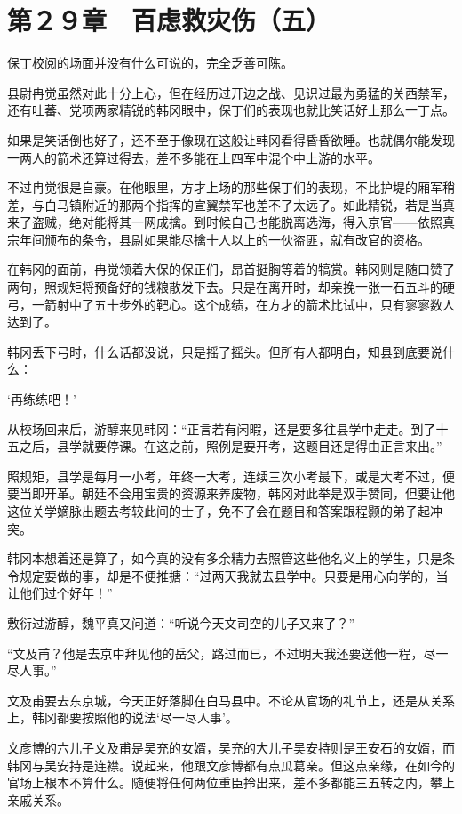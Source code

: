 \section{第２９章　百虑救灾伤（五）}

保丁校阅的场面并没有什么可说的，完全乏善可陈。

县尉冉觉虽然对此十分上心，但在经历过开边之战、见识过最为勇猛的关西禁军，还有吐蕃、党项两家精锐的韩冈眼中，保丁们的表现也就比笑话好上那么一丁点。

如果是笑话倒也好了，还不至于像现在这般让韩冈看得昏昏欲睡。也就偶尔能发现一两人的箭术还算过得去，差不多能在上四军中混个中上游的水平。

不过冉觉很是自豪。在他眼里，方才上场的那些保丁们的表现，不比护堤的厢军稍差，与白马镇附近的那两个指挥的宣翼禁军也差不了太远了。如此精锐，若是当真来了盗贼，绝对能将其一网成擒。到时候自己也能脱离选海，得入京官——依照真宗年间颁布的条令，县尉如果能尽擒十人以上的一伙盗匪，就有改官的资格。

在韩冈的面前，冉觉领着大保的保正们，昂首挺胸等着的犒赏。韩冈则是随口赞了两句，照规矩将预备好的钱粮散发下去。只是在离开时，却亲挽一张一石五斗的硬弓，一箭射中了五十步外的靶心。这个成绩，在方才的箭术比试中，只有寥寥数人达到了。

韩冈丢下弓时，什么话都没说，只是摇了摇头。但所有人都明白，知县到底要说什么：

‘再练练吧！’

从校场回来后，游醇来见韩冈：“正言若有闲暇，还是要多往县学中走走。到了十五之后，县学就要停课。在这之前，照例是要开考，这题目还是得由正言来出。”

照规矩，县学是每月一小考，年终一大考，连续三次小考最下，或是大考不过，便要当即开革。朝廷不会用宝贵的资源来养废物，韩冈对此举是双手赞同，但要让他这位关学嫡脉出题去考较此间的士子，免不了会在题目和答案跟程颢的弟子起冲突。

韩冈本想着还是算了，如今真的没有多余精力去照管这些他名义上的学生，只是条令规定要做的事，却是不便推搪：“过两天我就去县学中。只要是用心向学的，当让他们过个好年！”

敷衍过游醇，魏平真又问道：“听说今天文司空的儿子又来了？”

“文及甫？他是去京中拜见他的岳父，路过而已，不过明天我还要送他一程，尽一尽人事。”

文及甫要去东京城，今天正好落脚在白马县中。不论从官场的礼节上，还是从关系上，韩冈都要按照他的说法‘尽一尽人事’。

文彦博的六儿子文及甫是吴充的女婿，吴充的大儿子吴安持则是王安石的女婿，而韩冈与吴安持是连襟。说起来，他跟文彦博都有点瓜葛亲。但这点亲缘，在如今的官场上根本不算什么。随便将任何两位重臣拎出来，差不多都能三五转之内，攀上亲戚关系。

